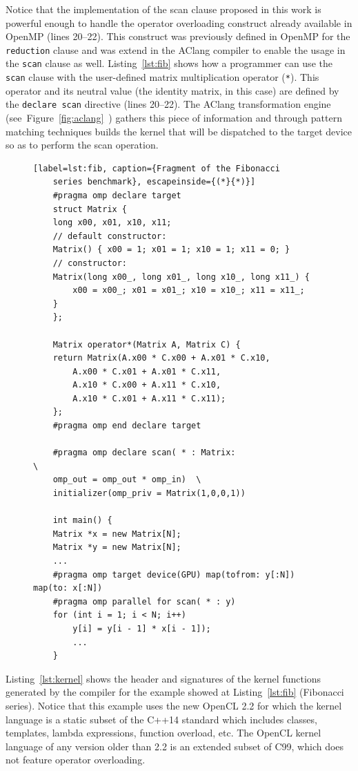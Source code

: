 \documentclass[Ingles]{ic-tese-v1}
\newcommand{\rfig}[1]{Figure~\ref{fig:#1}}
\newcommand{\ttt}[1]{{\texttt{#1}}}
\newcommand{\rlst}[1]{Listing~\ref{lst:#1}}
\begin{document}
Notice that the implementation
of the  scan clause  proposed in  this work  is powerful  enough to
handle  the operator  overloading  construct  already available  in
OpenMP (lines  20--22). This construct was  previously defined in
OpenMP for the \ttt{reduction} clause  and was extend in the AClang
compiler  to enable  the usage  in  the \ttt{scan}  clause as  well.
\rlst{fib} shows how a  programmer can use the \ttt{scan}
clause   with  the   user-defined  matrix   multiplication  operator
(\ttt{*}).   This  operator  and  its neutral  value  (the  identity
matrix,  in  this  case)  are  defined  by  the  \ttt{declare  scan}
directive   (lines  20--22).    The  AClang   transformation  engine
(see~\rfig{aclang}~) gathers  this piece  of information
and through pattern matching techniques  builds the kernel that will
be  dispatched to  the  target  device so  as  to  perform the  scan
operation.

\begin{figure}[t]
	\lstset{basicstyle=\scriptsize}
	\begin{lstlisting}[label=lst:fib, caption={Fragment of the Fibonacci
	series benchmark}, escapeinside={(*}{*)}]
	#pragma omp declare target
	struct Matrix {
	long x00, x01, x10, x11;
	// default constructor:
	Matrix() { x00 = 1; x01 = 1; x10 = 1; x11 = 0; }
	// constructor:
	Matrix(long x00_, long x01_, long x10_, long x11_) {
		x00 = x00_; x01 = x01_; x10 = x10_; x11 = x11_;
	}
	};

	Matrix operator*(Matrix A, Matrix C) {
	return Matrix(A.x00 * C.x00 + A.x01 * C.x10,
		A.x00 * C.x01 + A.x01 * C.x11,
		A.x10 * C.x00 + A.x11 * C.x10,
		A.x10 * C.x01 + A.x11 * C.x11);
	};
	#pragma omp end declare target

	#pragma omp declare scan( * : Matrix:                     \ 
	omp_out = omp_out * omp_in)  \
	initializer(omp_priv = Matrix(1,0,0,1))

	int main() {
	Matrix *x = new Matrix[N];
	Matrix *y = new Matrix[N];
	...
	#pragma omp target device(GPU) map(tofrom: y[:N]) map(to: x[:N])
	#pragma omp parallel for scan( * : y)
	for (int i = 1; i < N; i++)
		y[i] = y[i - 1] * x[i - 1]);
		...
	}
	\end{lstlisting}
\end{figure}

\rlst{kernel} shows the header and signatures of the kernel
functions  generated  by  the  compiler  for  the  example  showed  at
\rlst{fib} (Fibonacci  series). Notice that this
example uses the new OpenCL 2.2 for which  the kernel language is a
static subset of the C++14 standard  which includes classes, templates,
lambda  expressions,  function  overload, etc.  The  OpenCL  kernel
language of any version older than  2.2 is an extended subset of
C99,  which does not feature  operator overloading.
\end{document}

